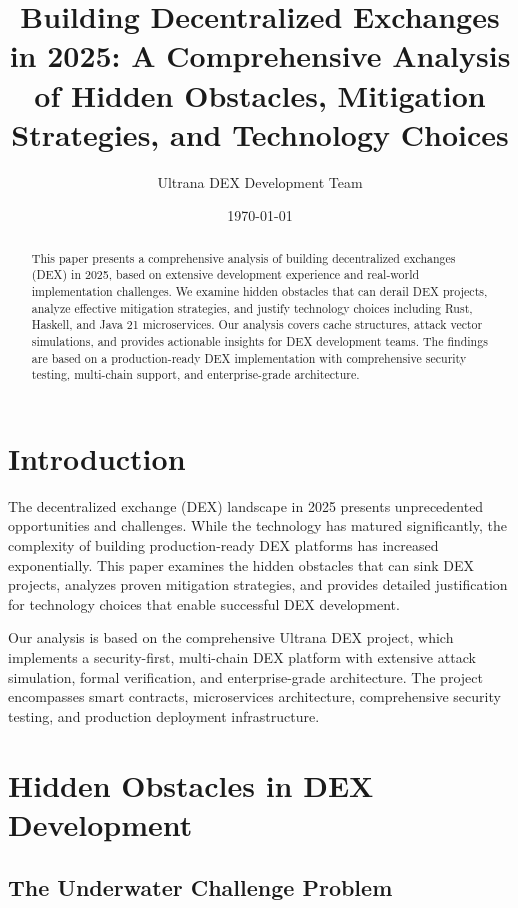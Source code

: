 \documentclass[11pt,a4paper]{article}
\title{\textbf{Building Decentralized Exchanges in 2025: A Comprehensive Analysis of Hidden Obstacles, Mitigation Strategies, and Technology Choices}}
\author{Ultrana DEX Development Team}
\date{\today}
\begin{document}
\maketitle

\begin{abstract}
This paper presents a comprehensive analysis of building decentralized exchanges (DEX) in 2025, based on extensive development experience and real-world implementation challenges. We examine hidden obstacles that can derail DEX projects, analyze effective mitigation strategies, and justify technology choices including Rust, Haskell, and Java 21 microservices. Our analysis covers cache structures, attack vector simulations, and provides actionable insights for DEX development teams. The findings are based on a production-ready DEX implementation with comprehensive security testing, multi-chain support, and enterprise-grade architecture.
\end{abstract}

\section{Introduction}

The decentralized exchange (DEX) landscape in 2025 presents unprecedented opportunities and challenges. While the technology has matured significantly, the complexity of building production-ready DEX platforms has increased exponentially. This paper examines the hidden obstacles that can sink DEX projects, analyzes proven mitigation strategies, and provides detailed justification for technology choices that enable successful DEX development.

Our analysis is based on the comprehensive Ultrana DEX project, which implements a security-first, multi-chain DEX platform with extensive attack simulation, formal verification, and enterprise-grade architecture. The project encompasses smart contracts, microservices architecture, comprehensive security testing, and production deployment infrastructure.

\section{Hidden Obstacles in DEX Development}

\subsection{The Underwater Challenge Problem}
\end{document}

